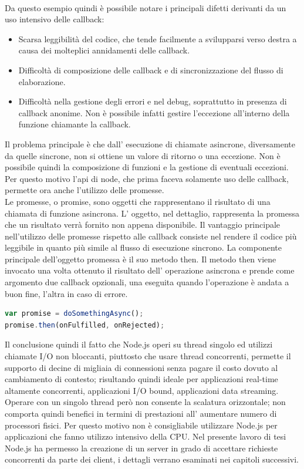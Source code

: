 \\
Da questo esempio quindi è possibile notare i principali difetti derivanti da un uso intensivo delle callback:
\begin{itemize}
\item Scarsa leggibilità del codice, che tende facilmente a svilupparsi verso destra a causa dei molteplici annidamenti delle callback.
\item Difficoltà di composizione delle callback e di sincronizzazione del flusso di elaborazione.
\item Difficoltà nella gestione degli errori e nel debug, soprattutto in presenza di callback anonime. Non è possibile infatti gestire l’eccezione all’interno della funzione chiamante la callback.
\end{itemize}
Il problema principale è che dall’ esecuzione di chiamate asincrone, diversamente da quelle sincrone, non si ottiene un valore di ritorno o una eccezione. Non è possibile quindi la composizione di funzioni e la gestione di eventuali eccezioni.
Per questo motivo l’api di node, che prima faceva solamente uso delle callback, permette ora anche l’utilizzo delle promesse. \cite{node4}
\\
Le promesse, o promise, sono oggetti che rappresentano il risultato di una chiamata di funzione asincrona. L’ oggetto, nel dettaglio, rappresenta la promessa che un risultato verrà fornito non appena disponibile.
Il vantaggio principale nell’utilizzo delle promesse rispetto alle callback consiste nel rendere il codice più leggibile in quanto più simile al flusso di esecuzione sincrono.
La componente principale dell’oggetto promessa è il suo metodo then. 
Il metodo then viene invocato una volta ottenuto il risultato dell’ operazione asincrona e prende come argomento due callback opzionali, una eseguita quando l’operazione è andata a buon fine, l’altra in caso di errore.
\begin{lstlisting}[language=javascript]
var promise = doSomethingAsync();
promise.then(onFulfilled, onRejected);
\end{lstlisting}
Il conclusione quindi il fatto che Node.js operi su thread singolo ed utilizzi chiamate I/O non bloccanti, piuttosto che usare thread concorrenti, permette il supporto di decine di migliaia di connessioni senza pagare il costo dovuto al cambiamento di contesto; risultando quindi ideale per applicazioni real-time altamente concorrenti, applicazioni I/O bound, applicazioni data streaming. \cite{node3}
\\
Operare con un singolo thread però non consente la scalatura orizzontale; non comporta quindi benefici in termini di prestazioni all’ aumentare numero di processori fisici. 
Per questo motivo non è consigliabile utilizzare Node.js per applicazioni che fanno utilizzo intensivo della CPU.
Nel presente lavoro di tesi Node.js ha permesso la creazione di un server in grado di accettare richieste concorrenti da parte dei client, i dettagli verrano esaminati nei capitoli successivi.

